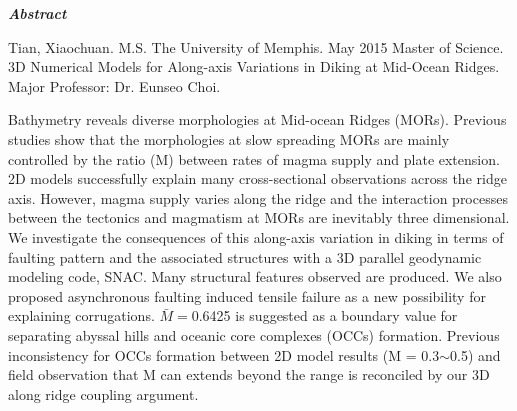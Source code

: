 \begin{center}
\textbf{\textit{Abstract}}
\end{center}

\vspace{0.5cm}

\begin{singlespace*}
Tian, Xiaochuan. M.S. The University of Memphis. May 2015 Master of Science. 3D Numerical Models for Along-axis Variations in Diking at Mid-Ocean Ridges. Major Professor: Dr. Eunseo Choi.
\end{singlespace*}

\vspace{0.5cm}

Bathymetry reveals diverse morphologies at Mid-ocean Ridges (MORs). Previous studies show that the morphologies at slow spreading MORs are mainly controlled by the ratio (M) between rates of magma supply and plate extension. 2D models successfully explain many cross-sectional observations across the ridge axis. However, magma supply varies along the ridge and the interaction processes between the tectonics and magmatism at MORs are inevitably three dimensional. We investigate the consequences of this along-axis variation in diking in terms of faulting pattern and the associated structures with a 3D parallel geodynamic modeling code, SNAC. Many structural features observed are produced. We also proposed asynchronous faulting induced tensile failure as a new possibility for explaining corrugations. $\bar{M} =$0.6425 is suggested as a boundary value for separating abyssal hills and oceanic core complexes (OCCs) formation. Previous inconsistency for OCCs formation between 2D model results (M = 0.3$\sim$0.5) and field observation that M can extends beyond the range is reconciled by our 3D along ridge coupling argument.  

